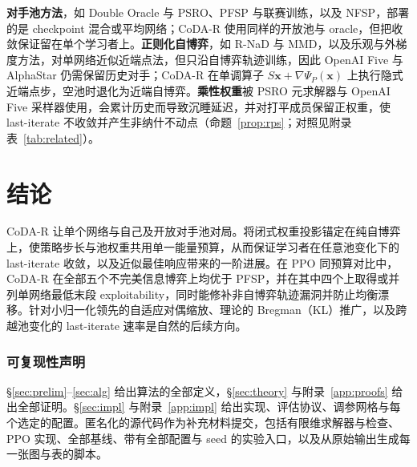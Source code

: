 \documentclass{article}
\theoremstyle{plain}
\theoremstyle{remark}
\newcommand{\bx}{{\bm{x}}}
\newcommand{\codar}{CoDA-R}
\begin{document}
\textbf{对手池方法}，如 Double Oracle 与 PSRO\citep{mcmahan2003doubleoracle,lanctot2017psro,muller2020generalized,mcaleer2020pipeline,wellman2006egta}、PFSP 与联赛训练\citep{vinyals2019alphastar}，以及 NFSP\citep{heinrich2015fsp,heinrich2016nfsp}，部署的是 checkpoint 混合或平均网络；\codar{} 使用同样的开放池与 oracle，但把收敛保证留在单个学习者上。\textbf{正则化自博弈}，如 R-NaD 与 MMD\citep{perolat2021rnad,perolat2022stratego,sokota2023mmd}，以及乐观与外梯度方法\citep{daskalakis2018optimism,mertikopoulos2019omd,nemirovski2004prox,cen2021extragradient}，对单网络近似近端点法\citep{rockafellar1976ppa,mokhtari2020ppa}，但只沿自博弈轨迹训练，因此 OpenAI Five 与 AlphaStar 仍需保留历史对手\citep{openai2019dota,vinyals2019alphastar}；\codar{} 在单调算子 $S\bx+\nabla\Psi_P(\bx)$ 上执行隐式近端点步，空池时退化为近端自博弈。\textbf{乘性权重}被 PSRO 元求解器与 OpenAI Five 采样器使用\citep{lanctot2017psro,mcaleer2022anytime,dinh2022odo,openai2019dota,freund1999hedge}，会累计历史而导致沉睡延迟\citep{herbster1998tracking}，并对打平成员保留正权重，使 last-iterate 不收敛\citep{bailey2018mwu}并产生非纳什不动点（命题~\ref{prop:rps}；对照见附录表~\ref{tab:related}）。

\section{结论}

\codar{} 让单个网络与自己及开放对手池对局。将闭式权重投影锚定在纯自博弈上，使策略步长与池权重共用单一能量预算，从而保证学习者在任意池变化下的 last-iterate 收敛，以及近似最佳响应带来的一阶进展。在 PPO 同预算对比中，\codar{} 在全部五个不完美信息博弈上均优于 PFSP，并在其中四个上取得或并列单网络最低末段 exploitability，同时能修补非自博弈轨迹漏洞并防止均衡漂移。针对小归一化领先的自适应对偶缩放、理论的 Bregman（KL）推广，以及跨越池变化的 last-iterate 速率是自然的后续方向。

\label{main-end}

\subsubsection*{可复现性声明}
\S\ref{sec:prelim}--\ref{sec:alg} 给出算法的全部定义，\S\ref{sec:theory} 与附录~\ref{app:proofs} 给出全部证明。\S\ref{sec:impl} 与附录~\ref{app:impl} 给出实现、评估协议、调参网格与每个选定的配置。匿名化的源代码作为补充材料提交，包括有限维求解器与检查、PPO 实现、全部基线、带有全部配置与 seed 的实验入口，以及从原始输出生成每一张图与表的脚本。
\end{document}
